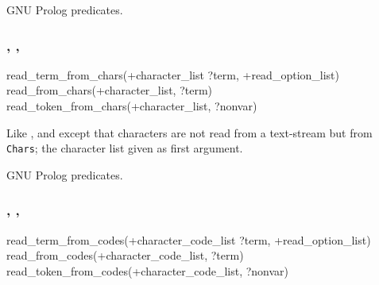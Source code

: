 \Portability

GNU Prolog predicates.

\subsubsection{,
               ,
               }

\begin{TemplatesOneCol}
read\_term\_from\_chars(+character\_list ?term,
+read\_option\_list)\\
read\_from\_chars(+character\_list, ?term)\\
read\_token\_from\_chars(+character\_list, ?nonvar)

\end{TemplatesOneCol}

\Description

\texttt{}%
\texttt{}%
\texttt{}%
Like ,   and
  except that characters are not
read from a text-stream but from \texttt{Chars}; the character list given as
first argument.

\begin{PlErrors}





\end{PlErrors}

\Portability

GNU Prolog predicates.

\subsubsection{,
               ,
               }

\begin{TemplatesOneCol}
read\_term\_from\_codes(+character\_code\_list ?term,
+read\_option\_list)\\
read\_from\_codes(+character\_code\_list, ?term)\\
read\_token\_from\_codes(+character\_code\_list, ?nonvar)

\end{TemplatesOneCol}

